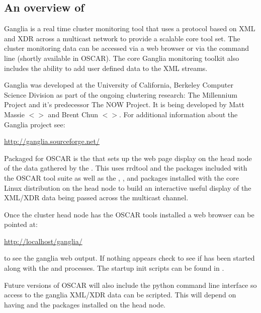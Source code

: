 %
%
%

\subsection{An overview of }
\label{app:ganglia-overview}

Ganglia is a real time cluster monitoring tool that uses a protocol
based on XML and XDR across a multicast network to provide a scalable
core tool set.  The cluster monitoring data can be accessed via a web
browser or via the command line (shortly available in OSCAR). The core
Ganglia monitoring toolkit also includes the ability to add user
defined data to the XML streams.

Ganglia was developed at the University of California, Berkeley
Computer Science Division as part of the ongoing clustering research:
The Millennium Project and it's predecessor The NOW Project.  It is
being developed by Matt Massie $<$$>$
and Brent Chun $<$$>$. For additional
information about the Ganglia project see:

\vspace{10pt}
\centerline{\url{http://ganglia.sourceforge.net/}}
\vspace{10pt}

Packaged for OSCAR is the  that sets
up the web page display on the head node of the data gathered by the
.  This uses rrdtool and the
 packages included with the OSCAR tool suite
as well as the , , and 
packages installed with the core Linux distribution on the head node
to build an interactive useful display of the XML/XDR data being
passed across the multicast channel.

Once the cluster head node has the OSCAR tools installed a web browser
can be pointed at:

\vspace{10pt}
\centerline{\url{http://localhost/ganglia/}}
\vspace{10pt}

\noindent to see the ganglia web output. If nothing appears check to
see if  has been started along with the  and
 processes. The startup init scripts can be found
in .

Future versions of OSCAR will also include the  python
command line interface so access to the ganglia XML/XDR data can be
scripted. This will depend on having  and the
 packages installed on the head node.

